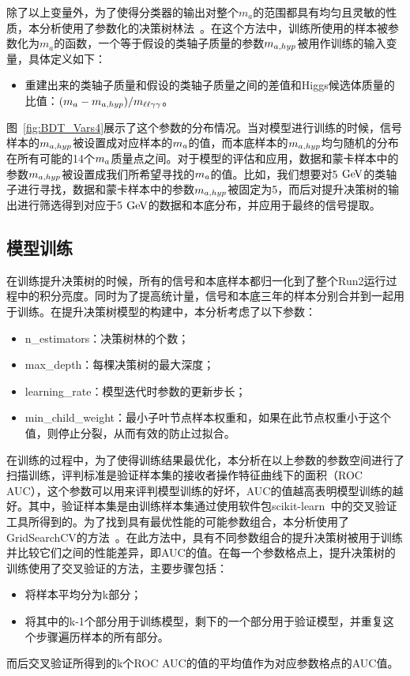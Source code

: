 除了以上变量外，为了使得分类器的输出对整个$m_a$的范围都具有均匀且灵敏的性质，本分析使用了参数化的决策树林法~\cite{Baldi_2016}。在这个方法中，训练所使用的样本被参数化为$m_a$的函数，一个等于假设的类轴子质量的参数$m_{a,hyp}$被用作训练的输入变量，具体定义如下：
\begin{itemize}
    \item 重建出来的类轴子质量和假设的类轴子质量之间的差值和Higgs候选体质量的比值：$(m_{a}-m_{a,hyp})/m_{\ell\ell\gamma\gamma}$。
\end{itemize}
图~\ref{fig:BDT_Vars4}展示了这个参数的分布情况。当对模型进行训练的时候，信号样本的$m_{a,hyp}$被设置成对应样本的$m_{a}$的值，而本底样本的$m_{a,hyp}$均匀随机的分布在所有可能的14个$m_{a}$质量点之间。对于模型的评估和应用，数据和蒙卡样本中的参数$m_{a,hyp}$被设置成我们所希望寻找的$m_{a}$的值。比如，我们想要对5$\GeV$的类轴子进行寻找，数据和蒙卡样本中的参数$m_{a,hyp}$被固定为5，而后对提升决策树的输出进行筛选得到对应于5$\GeV$的数据和本底分布，并应用于最终的信号提取。


\subsection{模型训练}

在训练提升决策树的时候，所有的信号和本底样本都归一化到了整个Run2运行过程中的积分亮度。同时为了提高统计量，信号和本底三年的样本分别合并到一起用于训练。在提升决策树模型的构建中，本分析考虑了以下参数：
\begin{itemize}
    \item n\_estimators：决策树林的个数；
    \item max\_depth：每棵决策树的最大深度；
    \item learning\_rate：模型迭代时参数的更新步长；
    \item min\_child\_weight：最小子叶节点样本权重和，如果在此节点权重小于这个值，则停止分裂，从而有效的防止过拟合。
\end{itemize}

在训练的过程中，为了使得训练结果最优化，本分析在以上参数的参数空间进行了扫描训练，评判标准是验证样本集的接收者操作特征曲线下的面积（ROC AUC），这个参数可以用来评判模型训练的好坏，AUC的值越高表明模型训练的越好。其中，验证样本集是由训练样本集通过使用软件包scikit-learn~\cite{scikit-learn}中的交叉验证工具所得到的。为了找到具有最优性能的可能参数组合，本分析使用了GridSearchCV的方法~\cite{gridcv}。在此方法中，具有不同参数组合的提升决策树被用于训练并比较它们之间的性能差异，即AUC的值。在每一个参数格点上，提升决策树的训练使用了交叉验证的方法，主要步骤包括：
\begin{itemize}
    \item 将样本平均分为k部分；
    \item 将其中的k-1个部分用于训练模型，剩下的一个部分用于验证模型，并重复这个步骤遍历样本的所有部分。
\end{itemize}
而后交叉验证所得到的k个ROC AUC的值的平均值作为对应参数格点的AUC值。

